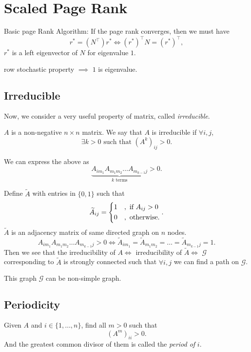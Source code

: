 \chapter{Scaled Page Rank}
\begin{prev}
	Basic page Rank Algorithm: If the page rank converges, then we must have
	\[
		r^{\ast} = (N^{\top})r^{\ast} \iff (r^{\ast})^{\top} N = (r^{\ast})^{\top},
	\]
	\(r^{\ast}\) is a left eigenvector of \(N\) for eigenvalue \(1\).
\end{prev}
\begin{remark}
	row stochastic property \(\implies\) \(1\) is eigenvalue.
\end{remark}

\section{Irreducible}
\par Now, we consider a very useful property of matrix, called \emph{irreducible}.
\begin{prev}
	\(A\) is a non-negative \(n\times n\) matrix. We say that \(A\) is irreducible if \(\forall i, j\),
	\[
		\exists k>0 \text{ such that }(A^k)_{ij} > 0.
	\]
\end{prev}
\begin{note}
	We can express the above as
	\[
		\underbrace{A_{im_1} A_{m_{1}m_2} \ldots A_{m_{k-1}j}}_{k\text{ terms}}>0.
	\]
\end{note}
Define \(\widetilde{A}\) with entries in \(\{0, 1\}\) such that
\[
	\widetilde{A}_{ij} = \begin{dcases}
		1 & , \text{ if }A_{ij}>0 \\
		0 & , \text{ otherwise}.
	\end{dcases}.
\]
\(\widetilde{A}\) is an adjacency matrix of same directed graph on \(n\) nodes.
\[
	A_{im_1} A_{m_1 m_2}\ldots A_{m_{k-1} j} > 0 \iff \widetilde{A}_{im_1} = \widetilde{A}_{m_1 m_2} = \ldots = \widetilde{A}_{m_{k-1}j} = 1.
\]
Then we see that the irreducibility of \(A \iff\) irreducibility of \(\widetilde{A}\iff\) \(\mathcal{G}\) corresponding to \(\widetilde{A}\) is strongly connected such that
\(\forall  i, j\) we can find a path on \(\mathcal{G}\).
\begin{remark}
	This graph \(\mathcal{G}\) can be non-simple graph.
\end{remark}

\section{Periodicity}
\begin{definition}[Period]
	Given \(A\) and \(i\in\{1, \ldots , n\}\), find all \(m>0\) such that
	\[
		(A^m)_{ii}>0.
	\]
	And the greatest common divisor of them is called the \emph{period of} \(i\).
\end{definition}

